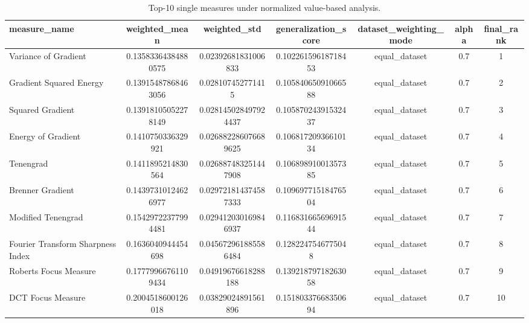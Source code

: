 \begin{table}[t]
\centering
\caption{Top-10 single measures under normalized value-based analysis.}
\begin{tabular}{lcccccc}
\hline
measure_name & weighted_mean & weighted_std & generalization_score & dataset_weighting_mode & alpha & final_rank \\
\hline
Variance of Gradient & 0.13583364384880575 & 0.02392681831006833 & 0.10226159618718453 & equal\_dataset & 0.7 & 1 \\
Gradient Squared Energy & 0.13915487868463056 & 0.028107452771415 & 0.10584065091066588 & equal\_dataset & 0.7 & 2 \\
Squared Gradient & 0.13918105052278149 & 0.028145028497924437 & 0.10587024391532437 & equal\_dataset & 0.7 & 3 \\
Energy of Gradient & 0.1410750336329921 & 0.026882286076689625 & 0.10681720936610134 & equal\_dataset & 0.7 & 4 \\
Tenengrad & 0.1411895214830564 & 0.026887483251447908 & 0.10689891001357385 & equal\_dataset & 0.7 & 5 \\
Brenner Gradient & 0.14397310124626977 & 0.029721814374587333 & 0.10969771518476504 & equal\_dataset & 0.7 & 6 \\
Modified Tenengrad & 0.15429722377994481 & 0.029412030169846937 & 0.11683166569691544 & equal\_dataset & 0.7 & 7 \\
Fourier Transform Sharpness Index & 0.1636040944454698 & 0.045672961885586484 & 0.1282247546775048 & equal\_dataset & 0.7 & 8 \\
Roberts Focus Measure & 0.17779966761109434 & 0.04919676618288188 & 0.13921879718263058 & equal\_dataset & 0.7 & 9 \\
DCT Focus Measure & 0.2004518600126018 & 0.03829024891561896 & 0.15180337668350694 & equal\_dataset & 0.7 & 10 \\
\hline
\end{tabular}
\end{table}